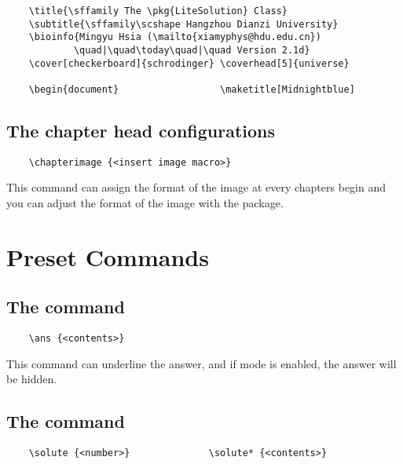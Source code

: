 \documentclass[mtpro2]{litesolution}
\begin{document}
\begin{verbatim}
    \title{\sffamily The \pkg{LiteSolution} Class}
    \subtitle{\sffamily\scshape Hangzhou Dianzi University}
    \bioinfo{Mingyu Hsia (\mailto{xiamyphys@hdu.edu.cn})
            \quad|\quad\today\quad|\quad Version 2.1d}
    \cover[checkerboard]{schrodinger} \coverhead[5]{universe}

    \begin{document}                  \maketitle[Midnightblue]
\end{verbatim}

\subsection{The chapter head configurations}

\begin{verbatim}
    \chapterimage {<insert image macro>}
\end{verbatim}

This command can assign the format of the image at every chapters begin and you can adjust the format of the image with the  package.

\section{Preset Commands}

\subsection{The  command}

\begin{verbatim}
    \ans {<contents>}
\end{verbatim}
 
This command can underline the answer, and if mode  is enabled, the answer will be hidden.

\subsection{The  command}

\begin{verbatim}
    \solute {<number>}              \solute* {<contents>}
\end{verbatim}
\end{document}
